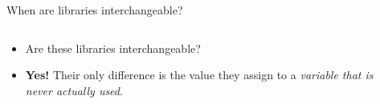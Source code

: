 \documentclass[aspectratio=169, lualatex, handout]{beamer}
\begin{document}
\begin{frame}{When are libraries interchangeable?}
	\begin{columns}[c]
		\begin{column}{0.5\textwidth}
			\begin{itemize}[<+->]
				\item Are these libraries interchangeable?
				\item \textbf{Yes!} Their only difference is the value they assign to a \textit{variable that is never actually used}.
			\end{itemize}
		\end{column}
		\begin{column}{0.05\textwidth}
		\end{column}
		\begin{column}{0.45\textwidth}
		\end{column}
	\end{columns}
\end{frame}
\end{document}
